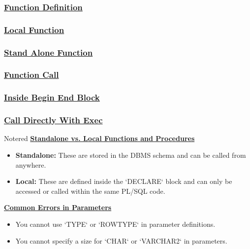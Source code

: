\subsubsection*{\underline{Function Definition}}

\subsubsection*{\underline{Local Function}}




\newpage

\subsubsection*{\underline{Stand Alone Function}}



\subsubsection*{\underline{Function Call}}

\subsubsection*{\underline{Inside Begin End Block}}



\subsubsection*{\underline{Call Directly With Exec}}



\vspace{0.25cm}

\begin{prettyBox}{Note}{red}
\textbf{\underline{Standalone vs. Local Functions and Procedures}}
\begin{itemize}
    \item \textbf{Standalone:} These are stored in the DBMS schema and can be called from anywhere.
    \item \textbf{Local:} These are defined inside the `DECLARE` block and can only be accessed or called within the same PL/SQL code.
\end{itemize}

\vspace{0.25cm}

\textbf{\underline{Common Errors in Parameters}}

\begin{itemize}
    \item You cannot use `TYPE` or `ROWTYPE` in parameter definitions.
    \item You cannot specify a size for `CHAR` or `VARCHAR2` in parameters.
\end{itemize}
\end{prettyBox}



